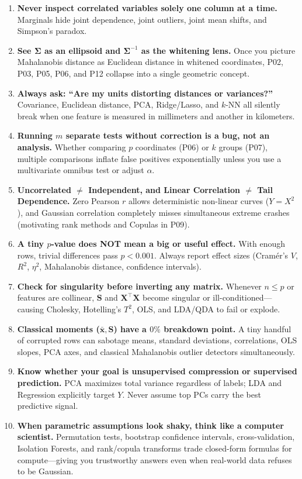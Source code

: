 \documentclass[11pt, a4paper]{article}
\begin{document}
\begin{enumerate}
    \item \textbf{Never inspect correlated variables solely one column at a time.} Marginals hide joint dependence, joint outliers, joint mean shifts, and Simpson's paradox.
    \item \textbf{See $\boldsymbol{\Sigma}$ as an ellipsoid and $\boldsymbol{\Sigma}^{-1}$ as the whitening lens.} Once you picture Mahalanobis distance as Euclidean distance in whitened coordinates, P02, P03, P05, P06, and P12 collapse into a single geometric concept.
    \item \textbf{Always ask: ``Are my units distorting distances or variances?''} Covariance, Euclidean distance, PCA, Ridge/Lasso, and $k$-NN all silently break when one feature is measured in millimeters and another in kilometers.
    \item \textbf{Running $m$ separate tests without correction is a bug, not an analysis.} Whether comparing $p$ coordinates (P06) or $k$ groups (P07), multiple comparisons inflate false positives exponentially unless you use a multivariate omnibus test or adjust $\alpha$.
    \item \textbf{Uncorrelated $\neq$ Independent, and Linear Correlation $\neq$ Tail Dependence.} Zero Pearson $r$ allows deterministic non-linear curves ($Y = X^2$), and Gaussian correlation completely misses simultaneous extreme crashes (motivating rank methods and Copulas in P09).
    \item \textbf{A tiny $p$-value does NOT mean a big or useful effect.} With enough rows, trivial differences pass $p < 0.001$. Always report effect sizes (Cramér's $V$, $R^2$, $\eta^2$, Mahalanobis distance, confidence intervals).
    \item \textbf{Check for singularity before inverting any matrix.} Whenever $n \le p$ or features are collinear, $\mathbf{S}$ and $\mathbf{X}^\top \mathbf{X}$ become singular or ill-conditioned---causing Cholesky, Hotelling's $T^2$, OLS, and LDA/QDA to fail or explode.
    \item \textbf{Classical moments ($\bar{\mathbf{x}}, \mathbf{S}$) have a $0\%$ breakdown point.} A tiny handful of corrupted rows can sabotage means, standard deviations, correlations, OLS slopes, PCA axes, and classical Mahalanobis outlier detectors simultaneously.
    \item \textbf{Know whether your goal is unsupervised compression or supervised prediction.} PCA maximizes total variance regardless of labels; LDA and Regression explicitly target $Y$. Never assume top PCs carry the best predictive signal.
    \item \textbf{When parametric assumptions look shaky, think like a computer scientist.} Permutation tests, bootstrap confidence intervals, cross-validation, Isolation Forests, and rank/copula transforms trade closed-form formulas for compute---giving you trustworthy answers even when real-world data refuses to be Gaussian.
\end{enumerate}
\end{document}
